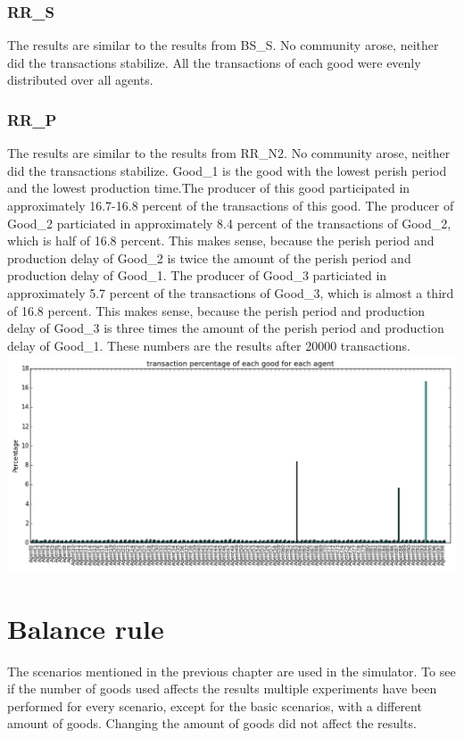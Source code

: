 \documentclass[twoside,openright]{uva-bachelor-thesis}
\begin{document}
\subsubsection{RR\_S}
The results are similar to the results from BS\_S. No community arose, neither did the transactions stabilize. All the transactions of each good were evenly distributed over all agents. 

\subsubsection{RR\_P}
The results are similar to the results from RR\_N2. No community arose, neither did the transactions stabilize. Good\_1 is the good with the lowest perish period and the lowest production time.The producer of this good participated in approximately 16.7-16.8 percent of the transactions of this good. The producer of Good\_2 particiated in approximately 8.4 percent of the transactions of Good\_2, which is half of 16.8 percent. This makes sense, because the perish period and production delay of Good\_2 is twice the amount of the perish period and production delay of Good\_1. The producer of Good\_3 particiated in approximately 5.7 percent of the transactions of Good\_3, which is almost a third of 16.8 percent. This makes sense, because the perish period and production delay of Good\_3 is three times the amount of the perish period and production delay of Good\_1. 
These numbers are the results after 20000 transactions. \\
\includegraphics[scale=0.4]{experiment_images/RR_P}

\section{Balance rule}
The scenarios mentioned in the previous chapter are used in the simulator. To see if the number of goods used affects the results multiple experiments have been performed for every scenario, except for the basic scenarios, with a different amount of goods. Changing the amount of goods did not affect the results.
\end{document}
